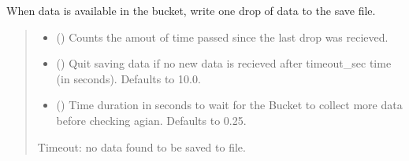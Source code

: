 \documentclass[letterpaper,10pt,english]{sphinxmanual}
\begin{document}
\begin{fulllineitems}

\begin{fulllineitems}
\label{\detokenize{PodApi.Stream.Collect:PodApi.Stream.Collect.DrainBucketToFile.DrainBucket._DrainDropToFile}}
\pysigstartsignatures
{}
\pysigstopsignatures
\sphinxAtStartPar
When data is available in the bucket, write one drop of data to the save file.
\begin{quote}\begin{description}
\begin{itemize}
\item {} 
\sphinxAtStartPar
{} () \textendash{} Counts the amout of time passed since the last drop was recieved.

\item {} 
\sphinxAtStartPar
{} (\sphinxstyleliteralemphasis{\sphinxupquote{, }}) \textendash{} Quit saving data if no new data is recieved                 after timeout\_sec time (in seconds). Defaults to 10.0.

\item {} 
\sphinxAtStartPar
{} (\sphinxstyleliteralemphasis{\sphinxupquote{, }}) \textendash{} Time duration in seconds to wait for the Bucket to                 collect more data before checking agian. Defaults to 0.25.

\end{itemize}

\sphinxAtStartPar
{} \textendash{} Timeout: no data found to be saved to file.


\end{description}
\end{quote}
\end{fulllineitems}
\end{fulllineitems}
\end{document}

